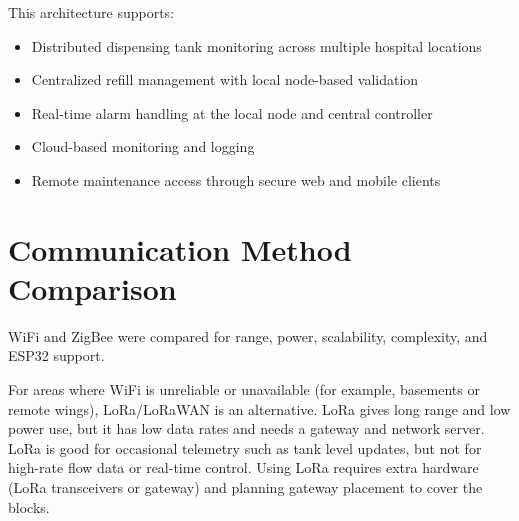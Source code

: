 \documentclass[12pt,a4paper]{report}
\begin{document}
\noindent This architecture supports:

\begin{itemize}
    \item Distributed dispensing tank monitoring across multiple hospital locations
    \item Centralized refill management with local node-based validation
    \item Real-time alarm handling at the local node and central controller
    \item Cloud-based monitoring and logging
    \item Remote maintenance access through secure web and mobile clients
\end{itemize}

\section{Communication Method Comparison}

WiFi and ZigBee were compared for range, power, scalability, complexity, and ESP32 support.

For areas where WiFi is unreliable or unavailable (for example, basements or remote wings), LoRa/LoRaWAN is an alternative. LoRa gives long range and low power use, but it has low data rates and needs a gateway and network server. LoRa is good for occasional telemetry such as tank level updates, but not for high-rate flow data or real-time control. Using LoRa requires extra hardware (LoRa transceivers or gateway) and planning gateway placement to cover the blocks.
\end{document}
